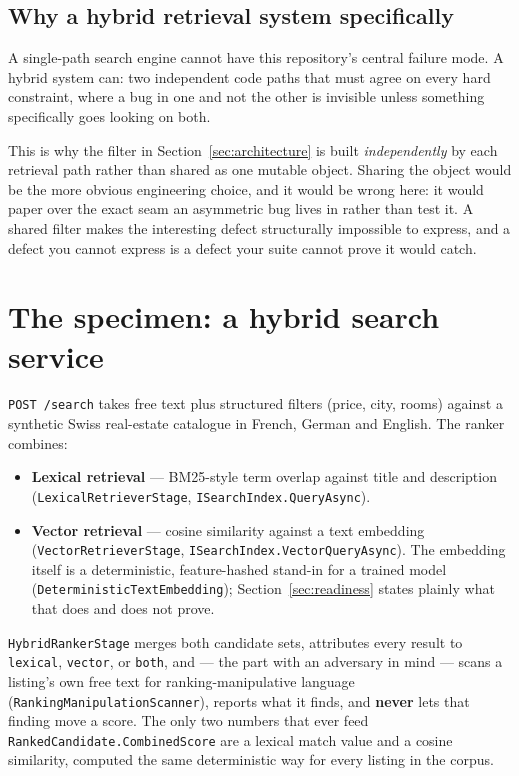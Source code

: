 \documentclass[11pt,a4paper]{article}
\begin{document}
\subsection{Why a hybrid retrieval system specifically}

A single-path search engine cannot have this repository's central failure
mode. A hybrid system can: two independent code paths that must agree on every
hard constraint, where a bug in one and not the other is invisible unless
something specifically goes looking on both.

This is why the filter in Section~\ref{sec:architecture} is built
\emph{independently} by each retrieval path rather than shared as one mutable
object. Sharing the object would be the more obvious engineering choice, and
it would be wrong here: it would paper over the exact seam an asymmetric bug
lives in rather than test it. A shared filter makes the interesting defect
structurally impossible to express, and a defect you cannot express is a
defect your suite cannot prove it would catch.

\section{The specimen: a hybrid search service}

\texttt{POST /search} takes free text plus structured filters (price, city,
rooms) against a synthetic Swiss real-estate catalogue in French, German and
English. The ranker combines:

\begin{itemize}[leftmargin=1.4em]
  \item \textbf{Lexical retrieval} --- BM25-style term overlap against title
        and description (\texttt{Lexical\-Retriever\-Stage},
        \texttt{ISearchIndex.\-QueryAsync}).
  \item \textbf{Vector retrieval} --- cosine similarity against a text
        embedding (\texttt{VectorRetrieverStage},
        \texttt{ISearchIndex.\-VectorQueryAsync}). The embedding itself is a
        deterministic, feature-hashed stand-in for a trained model
        (\texttt{DeterministicTextEmbedding});
        Section~\ref{sec:readiness} states plainly what that does and does not
        prove.
\end{itemize}

\texttt{HybridRankerStage} merges both candidate sets, attributes every result
to \texttt{lexical}, \texttt{vector}, or \texttt{both}, and --- the part with
an adversary in mind --- scans a listing's own free text for
ranking-manipulative language (\texttt{RankingManipulationScanner}), reports
what it finds, and \textbf{never} lets that finding move a score. The only two
numbers that ever feed \texttt{RankedCandidate.CombinedScore} are a lexical
match value and a cosine similarity, computed the same deterministic way for
every listing in the corpus.
\end{document}
